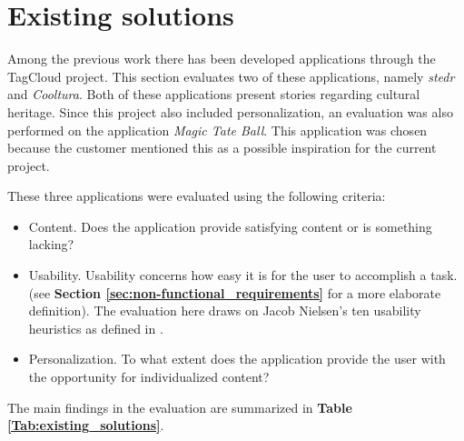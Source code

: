 \section{Existing solutions}
\label{sec:existing_solutions}

Among the previous work there has been developed applications through the TagCloud project. This section evaluates two of these applications, namely \textit{stedr} and \textit{Cooltura}. Both of these applications present stories regarding cultural heritage. Since this project also included personalization, an evaluation was also performed on the application \textit{Magic Tate Ball}. This application was chosen because the customer mentioned this as a possible inspiration for the current project. \newline

These three applications were evaluated using the following criteria:
\begin{itemize}
\item Content. Does the application provide satisfying content or is something lacking?
\item Usability. Usability concerns how easy it is for the user to accomplish a task. (see \textbf{Section \ref{sec:non-functional_requirements}} for a more elaborate definition). The evaluation here draws on Jacob Nielsen’s ten usability heuristics as defined in \cite{AS3}.  
\item Personalization. To what extent does the application provide the user with the opportunity for individualized content?
\end{itemize}

The main findings in the evaluation are summarized in \textbf{Table \ref{Tab:existing_solutions}}.

